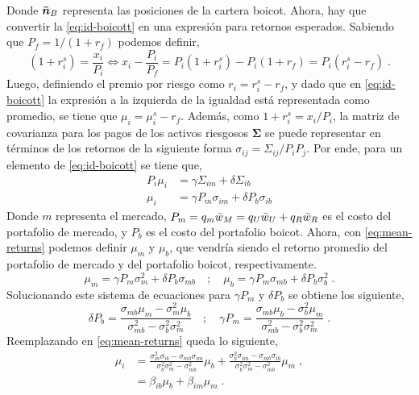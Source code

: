 \documentclass{article}
\begin{document}
Donde $\bm{\Bar{n}}_B$ representa las posiciones de la cartera boicot. Ahora, hay que convertir la \eqref{eq:id-boicott} en una expresión para retornos esperados. Sabiendo que $P_f=1/(1+r_f)$ podemos definir,
\begin{equation*}
	(1+r^{s}_{i}) = \frac{x_i}{P_i} \Leftrightarrow x_i - \frac{P_i}{P_f}=P_i(1+r^{s}_{i}) - P_i(1+r_f)=P_i(r^{s}_{i}-r_f)\;.
\end{equation*}
Luego, definiendo el premio por riesgo como $r_i=r^{s}_{i}-r_{f}$, y dado que en \eqref{eq:id-boicott} la expresión a la izquierda de la igualdad está representada como promedio, se tiene que $\mu_{i}=\mu^{s}_{i}-r_{f}$. Además, como $1+r^{s}_{i}=x_i/P_i$, la matriz de covarianza para los pagos de los activos riesgosos $\bm{\Sigma}$ se puede representar en términos de los retornos de la siguiente forma $\sigma_{ij}=\Sigma_{ij}/P_{i}P_{j}$. Por ende, para un elemento de \eqref{eq:id-boicott} se tiene que,
\begin{equation}
	\begin{split}
		P_i \mu_i&=\gamma \Sigma_{im} + \delta\Sigma_{ib}\\
		\mu_{i} &= \gamma P_m \sigma_{im} + \delta P_b \sigma_{ib}
	\end{split}
	\label{eq:mean-returns}
\end{equation}
Donde $m$ representa el mercado, $P_m =q_m \Bar{w}_{M}=q_U \Bar{w}_{U} + q_R \Bar{w}_{R} $ es el costo del portafolio de mercado, y $P_b$ es el costo del portafolio boicot. Ahora, con \eqref{eq:mean-returns} podemos definir $\mu_{m}$ y $\mu_{b}$, que vendría siendo el retorno promedio del portafolio de mercado y del portafolio boicot, respectivamente.
\begin{equation*}
	\mu_{m} = \gamma P_m \sigma^{2}_{m} + \delta P_b \sigma_{mb} \quad; \quad \mu_{b} = \gamma P_m \sigma_{mb} + \delta P_b \sigma^{2}_{b}\;.
\end{equation*}
Solucionando este sistema de ecuaciones para $\gamma P_m$ y $\delta P_b$ se obtiene los siguiente,
\begin{equation*}
	\delta P_b = \frac{\sigma_{mb}\mu_{m}-\sigma^{2}_{m}\mu_{b}}{\sigma^{2}_{mb}-\sigma^{2}_{b}\sigma^{2}_{m}}\quad ; \quad \gamma P_m = \frac{\sigma_{mb}\mu_{b}-\sigma^{2}_{b}\mu_{m}}{\sigma^{2}_{mb}-\sigma^{2}_{b}\sigma^{2}_{m}}\;.
\end{equation*}
Reemplazando en \eqref{eq:mean-returns} queda lo siguiente,
\begin{equation}
	\begin{split}
		\mu_{i} &= \frac{\sigma^{2}_{m}\sigma_{ib}-\sigma_{mb}\sigma_{im}}{\sigma^{2}_{b}\sigma^{2}_{m}-\sigma^{2}_{mb}}\mu_{b} + \frac{\sigma^{2}_{b}\sigma_{im}-\sigma_{mb}\sigma_{ib}}{\sigma^{2}_{b}\sigma^{2}_{m}-\sigma^{2}_{mb}}\mu_{m}\;,\\
		&= \beta_{ib}\mu_{b} + \beta_{im}\mu_{m}\;.\\  
	\end{split}
\end{equation}
\end{document}
